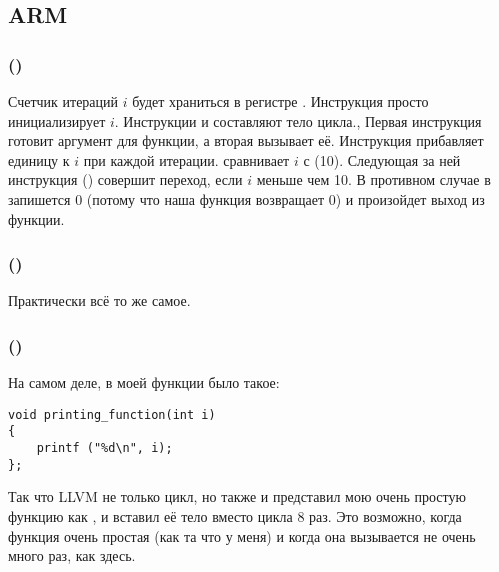 \subsection{ARM}

\subsubsection{\NonOptimizingKeilVI (\ARMMode)}



Счетчик итераций $i$ будет храниться в регистре .
Инструкция  просто инициализирует $i$.
Инструкции  и  составляют тело цикла., 
Первая инструкция готовит аргумент для функции, \ttf а вторая вызывает её.
Инструкция  прибавляет единицу к $i$ при каждой итерации.
 сравнивает $i$ с  (10). 
Следующая за ней инструкция  () совершит переход, если $i$ меньше чем 10.
В противном случае в  запишется 0 (потому что наша функция возвращает 0) 
и произойдет выход из функции.

\subsubsection{\OptimizingKeilVI (\ThumbMode)}



Практически всё то же самое.

\subsubsection{\OptimizingXcodeIV (\ThumbTwoMode)}
\label{ARM_unrolled_loops}



На самом деле, в моей функции \ttf было такое:

\begin{lstlisting}
void printing_function(int i)
{
    printf ("%d\n", i);
};
\end{lstlisting}

Так что LLVM не только  цикл, 
но также и представил мою очень простую функцию \ttf как ,
и вставил её тело вместо цикла 8 раз. 
Это возможно, когда функция очень простая (как та что у меня) и когда
она вызывается не очень много раз, как здесь.

